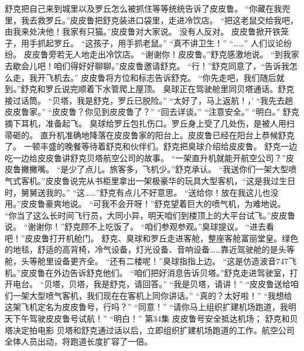 \documentclass[a4paper,12pt,UTF8,twoside]{ctexbook}
\begin{document}
        舒克把自己来到城里以及罗丘怎么被抓住等等统统告诉了皮皮鲁。 
        “你藏在我兜里，我去救罗丘。”皮皮鲁把舒克装进口袋里，走进冷饮店。 
        “把这老鼠交给我吧，由我来处决他！我家有只猫。”皮皮鲁对大家说。 
        没有人反对。 
        皮皮鲁掀开铁笼子，用手抓起罗丘。 
        “这孩子，用手抓老鼠。” 
        “真不讲卫生！” 
        “……” 
        人们议论纷纷。 
        皮皮鲁旁若无人地走出冷饮店。 
        “谢谢你！皮皮鲁。”舒克感激地说。 
        “到我家去歇会儿吧！咱们得好好聊聊。”皮皮鲁邀请舒克。 
        “行！”舒克同意了，“告诉我怎么走，我开飞机去。” 
        皮皮鲁将方位和标志告诉舒克。 
        “你先走吧，我们随后就到。”舒克和罗丘说完顺着下水管爬上屋顶。 
        臭球正在驾驶舱里同贝塔通话。舒克接过话筒。 
        “贝塔，我是舒克，罗丘已脱险。” 
        “太好了，马上返航！，’ 
        “我先去趟皮皮鲁家。” 
        “皮皮鲁？你见到皮皮鲁了？” 
        “回去详谈。” 
        “注意安全。” 
        “明白。” 
        舒克摘下耳机，准备起飞。 
        臭球给罗丘包扎伤口。罗丘身上受了几处伤，是被人用扫帚砸的。 
        直升机准确地降落在皮皮鲁家的阳台上。皮皮鲁已经在阳台上恭候舒克了。 
        一顿丰盛的晚餐等待着舒克和伙伴们。舒克把臭球介绍给皮皮鲁。 
        舒克一边吃一边给皮皮鲁讲舒克贝塔航空公司的故事。 
        “一架直升机就能开航空公司？”皮皮鲁撇撇嘴。 
        “是少了点儿。旅客多，飞机少。”舒克承认。 
        “我送你们一架大型喷气式客机。”皮皮鲁说完从书柜里拿出一架极豪华的玩具大型客机，“这是我过生日时，舅舅送我的。” 
        “这……”舒克有点儿不好意思。 
        “送给你！放在我这儿也没用。”皮皮鲁豪爽地说。 
        “可我不会开呀！”舒克望着巨大的喷气机，为难地说。 
        “你当了这么长时间飞行员，大同小异，明天咱们到楼顶上的大平台试飞。”皮皮鲁说。 
        “谢谢你！”舒克顾不上吃饭了。 
        “咱们参观参观。”臭球提议。 
        “进去看吧！”皮皮鲁打开机舱门。 
        舒克、臭球和罗丘走进客舱，整座客舱富丽堂皇。绿色的地毯，舒适的高背椅，冷气设备，灯光设备、音响设备……靠近驾驶舱的是头等舱，头等舱里设备更齐全。 
        “还有二楼呢！”臭球指指上边。 
        “这是仿造波音747飞机。”皮皮鲁在外边告诉舒克他们。 
        “咱们把好消息告诉贝塔。”舒克走进驾驶室，打开电台。 
        “贝塔，贝塔，我是舒克，请回答。” 
        “我是贝塔，请讲！” 
        “皮皮鲁送给咱们一架大型喷气客机，我们现在在客机上同你讲话。” 
        “真的？太好啦！” 
        “我想给这架飞机定名为皮皮鲁号，行吗？” 
        “同意！” 
        “请你马上组织扩建机场跑道，我明天下午驾驶皮皮鲁号试航！” 
        “明白！”   第34集 
        皮皮鲁号安全抵达机场； 
        舒克和贝塔决定拍电影   
        贝塔和舒克通过话以后，立即组织扩建机场跑道的工作。航空公司全体人员出动，将跑道长度扩容了一倍。 
\end{document}
